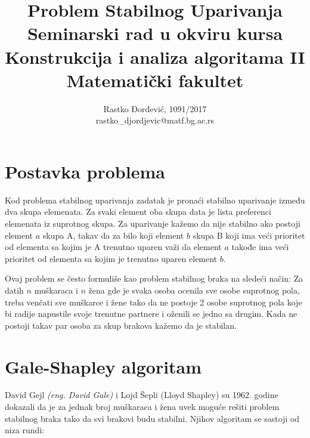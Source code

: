 \documentclass[a4paper]{article}
\begin{document}
\title{Problem Stabilnog Uparivanja\\ \small{Seminarski rad u okviru kursa\\Konstrukcija i analiza algoritama II\\ Matematički fakultet}}

\author{Rastko Đorđević, 1091/2017\\ rastko\_djordjevic@matf.bg.ac.rs}
\maketitle


\tableofcontents

\newpage



\section{Postavka problema}

Kod problema stabilnog uparivanja zadatak je pronaći stabilno uparivanje između dva skupa elemenata. Za svaki element oba skupa data je lista preferenci elemenata iz suprotnog skupa. Za uparivanje kažemo da nije stabilno ako postoji element $a$ skupa A, takav da za bilo koji element $b$ skupa B koji ima veći prioritet od elementa sa kojim je A trenutno uparen važi da element $a$ takođe ima veći prioritet od elementa sa kojim je trenutno uparen element $b$. 

Ovaj problem se često formuliše kao problem stabilnog braka na sledeći način:
Za datih $n$ muškaraca i $n$ žena gde je svaka osoba ocenila sve osobe suprotnog pola, treba venčati sve muškarce i žene tako da ne postoje 2 osobe suprotnog pola koje bi radije napustile svoje trenutne partnere i oženili se jedno sa drugim. Kada ne postoji takav par osoba za skup brakova kažemo da je stabilan.

\section{Gale-Shapley algoritam}

David Gejl \textit{(eng. David Gale)} i Lojd Šepli (Lloyd Shapley) su 1962. godine dokazali da je za jednak broj muškaraca i žena uvek moguće rešiti problem stabilnog braka tako da svi brakovi budu stabilni\cite{galeShapley}. Njihov algoritam se sastoji od niza rundi:
\end{document}
